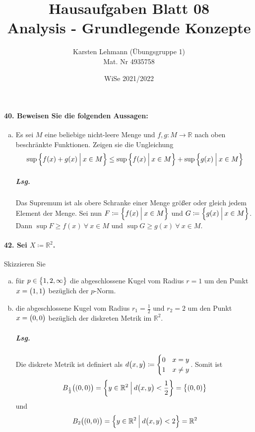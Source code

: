 \documentclass{scrreprt}
\author{Karsten Lehmann (Übungsgruppe 1)\\Mat. Nr 4935758}
\date{WiSe 2021/2022}
\title{Hausaufgaben Blatt 08\\Analysis - Grundlegende Konzepte}
\begin{document}
\paragraph{40. Beweisen Sie die folgenden Aussagen:}
\begin{enumerate}[(a)]
\item Es sei $M$ eine beliebige nicht-leere Menge und
  $f, g \colon M \to \mathbb{R}$ nach oben beschränkte Funktionen.
  Zeigen sie die Ungleichung
  \[
    \sup\qty{f(x) + g(x) \: {\Big |} \: x \in M}
    \leq
    \sup\qty{f(x) \: {\Big |} \: x \in M} +
    \sup\qty{g(x) \: {\Big |} \: x \in M}
  \]

  \subparagraph{Lsg.} Das Supremum ist als obere Schranke einer Menge größer
  oder gleich jedem Element der Menge.
  Sei nun $F \coloneqq \qty{f(x) \: {\Big |} \: x \in M}$ und
  $G \coloneqq \qty{g(x) \: {\Big |} \: x \in M}$.
  Dann $\sup F \geq f(x) \: \forall \: x \in M$ und
  $\sup G \geq g(x) \: \forall \: x \in M$.
\end{enumerate}

\paragraph{42. Sei $X \coloneqq \mathbb{R}^2$.}
Skizzieren Sie

\begin{enumerate}[(a)]
\item für $p \in \qty\big{1, 2, \infty}$ die abgeschlossene Kugel vom Radius
  $r = 1$ um den Punkt $x = \qty\big(1, 1)$ bezüglich der $p$-Norm.

\item die abgeschlossene Kugel vom Radius $r_1 = \frac{1}{2}$ und $r_2 = 2$
  um den Punkt $x = \qty\big(0, 0)$ bezüglich der diskreten Metrik im
  $\mathbb{R}^2$.

  \subparagraph{Lsg.} Die diskrete Metrik ist definiert als
  $d\qty\big(x, y) \coloneqq \begin{cases}
    0 & x = y \\
    1 & x \ne y
  \end{cases}$.
  Somit ist
  \[
    B_{\frac{1}{2}}\qty\big((0, 0))
    = \qty{y \in \mathbb{R}^2 \: {\Big |} \: d\qty\big(x, y) < \frac{1}{2}}
    = \qty\big{\qty(0, 0)}
  \]
  und
  \[
    B_2\qty\big((0, 0))
    = \qty{y \in \mathbb{R}^2 \: {\Big |} \: d\qty\big(x, y) < 2}
    = \mathbb{R}^2
  \]
\end{enumerate}
\end{document}
